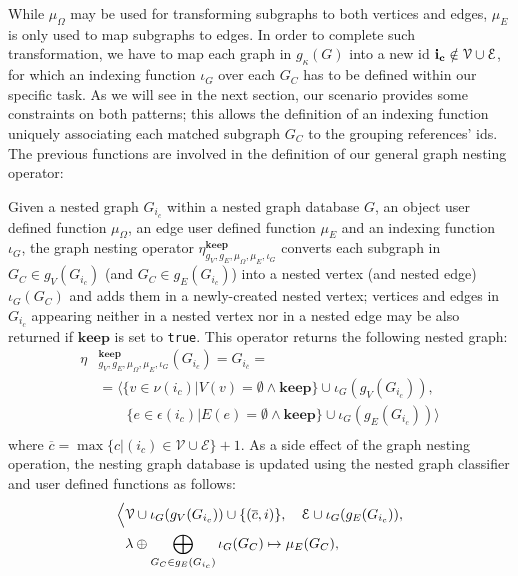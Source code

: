 While $\mu_\Omega$ may be used for transforming subgraphs to both vertices and edges, $\mu_E$ is only used to map subgraphs to edges.  
In order to complete such transformation, we have to map each graph in $g_\kappa(G)$ into a new id $\textbf{i}_{\textbf{c}}\notin \mathcal{V}\cup \mathcal{E}$, for which an indexing function $\iota_G$ over each $G_C$ has to be defined within our specific task. As we will see in the next section, our scenario provides some constraints on both patterns; this allows the definition of an indexing function  uniquely associating each matched subgraph  $G_C$  to the grouping references' ids.
The previous functions are involved in the definition of our general graph nesting operator:



\begin{definition}
	Given a nested graph $G_{i_c}$ within a nested graph database $G$, an object user defined function $\mu_\Omega$, an edge user defined function $\mu_E$ and an indexing function $\iota_G$, the graph nesting operator $\eta_{g_V,g_E,\mu_\Omega,\mu_E,\iota_G}^{\textbf{keep}}$ converts each subgraph in $G_C\in g_V(G_{i_c})$ (and $G_C\in g_E(G_{i_c})$) into a nested vertex (and nested edge) $\iota_G(G_C)$ and adds them in a newly-created nested vertex; vertices and edges in $G_{i_c}$ appearing neither in a nested vertex nor in a nested edge may be also returned if $\textbf{keep}$ is set to \texttt{true}. This operator returns the following nested graph:
	\[\begin{split}
	\eta&{}_{g_V,g_E,\mu_\Omega,\mu_E,\iota_G}^{\textbf{keep}}(G_{i_c})=G_{i_{\overline{c}}}=\\
	&=\Big\langle \{v\in \nu(i_c) | V(v)=\emptyset\wedge\textbf{keep} \}\cup \iota_G(g_V(G_{i_c})),\\
	&\qquad \{e\in \epsilon(i_c) | E(e)=\emptyset\wedge\textbf{keep} \}\cup \iota_G(g_E(G_{i_c}))\Big\rangle\\
	\end{split}\]
	where $\overline{c}=\max\{c|(i_c)\in\mathcal{V}\cup\mathcal{E}\}+1$. As a side effect of the graph nesting operation, the nesting graph database is updated using the nested graph classifier and user defined functions as follows:
	\begin{align*}
	\Big\langle&\VS\cup \iota_G(g_V(G_{i_c}))\cup\{(\overline{c},i)\},\quad \ES\cup \iota_G(g_E(G_{i_c})),\\
	& \lambda\oplus \bigoplus_{G_C\in g_E(G_{i_c})}\iota_G(G_C)\mapsto \mu_E(G_C),\\

\end{align*}
\end{definition}
